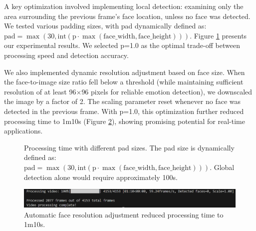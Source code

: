 A key optimization involved implementing local detection: examining only the area surrounding the previous frame's face location, unless no face was detected. We tested various padding sizes, with pad dynamically defined as: $\text{pad} = \max(30, \text{int}(\text{p} \cdot \max(\text{face\_width}, \text{face\_height})))$. Figure \ref{fig:pad_size} presents our experimental results. We selected p=1.0 as the optimal trade-off between processing speed and detection accuracy.

We also implemented dynamic resolution adjustment based on face size. When the face-to-image size ratio fell below a threshold (while maintaining sufficient resolution of at least 96$\times$96 pixels for reliable emotion detection), we downscaled the image by a factor of 2. The scaling parameter reset whenever no face was detected in the previous frame. With p=1.0, this optimization further reduced processing time to 1m10s (Figure \ref{auto_face_command}), showing promising potential for real-time applications.

\begin{figure}[!htb]
\centering
{}
\caption{Processing time with different pad sizes. The pad size is dynamically defined as: $\text{pad} = \max(30, \text{int}(\text{p} \cdot \max(\text{face\_width}, \text{face\_height})))$. Global detection alone would require approximately 100s.}
\label{fig:pad_size}
\end{figure}

\begin{figure}[!htb]
	\centering
	 \includegraphics[width=0.8\linewidth]{assets/auto_face_command.png}
	 \caption{Automatic face resolution adjustment reduced processing time to 1m10s.}
	 \label{auto_face_command}
\end{figure}

